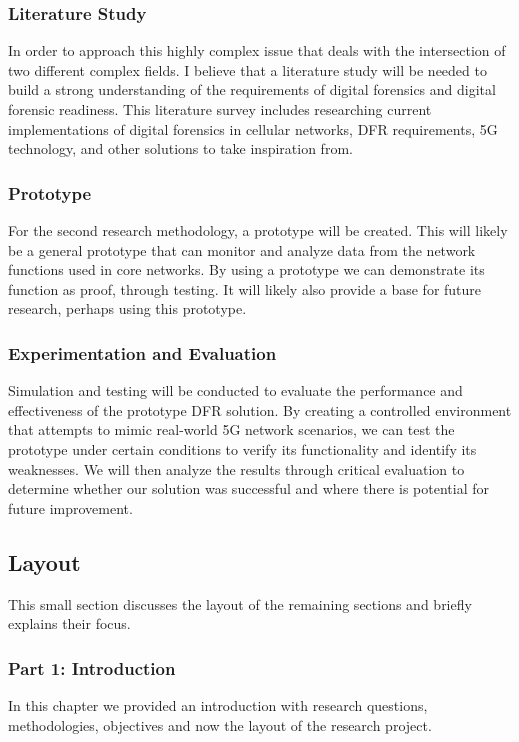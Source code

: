 \documentclass[final,1p,times,authoryear]{elsarticle}
\begin{document}
\subsubsection{Literature Study}
\label{sub1sub6sec1}
In order to approach this highly complex issue that deals with the intersection of two different complex fields. I believe that a literature study will be needed to build a strong understanding of the requirements of digital forensics and digital forensic readiness. This literature survey includes researching current implementations of digital forensics in cellular networks, DFR requirements, 5G technology, and other solutions to take inspiration from.


\subsubsection{Prototype}
\label{sub1sub6sec2}
For the second research methodology, a prototype will be created. This will likely be a general prototype that can monitor and analyze data from the network functions used in core networks. By using a prototype we can demonstrate its function as proof, through testing. It will likely also provide a base for future research, perhaps using this prototype.

\subsubsection{Experimentation and Evaluation}
\label{sub1sub6sec3}
Simulation and testing will be conducted to evaluate the performance and effectiveness of the prototype DFR solution. By creating a controlled environment that attempts to mimic real-world 5G network scenarios, we can test the prototype under certain conditions to verify its functionality and identify its weaknesses. We will then analyze the results through critical evaluation to determine whether our solution was successful and where there is potential for future improvement.

\newpage
\subsection{Layout}
\label{sub1sec7}
This small section discusses the layout of the remaining sections and briefly explains their focus.
\subsubsection{Part 1: Introduction}
\label{sub1sub7sec1}
In this chapter we provided an introduction with research questions, methodologies, objectives and now the layout of the research project.
\end{document}
